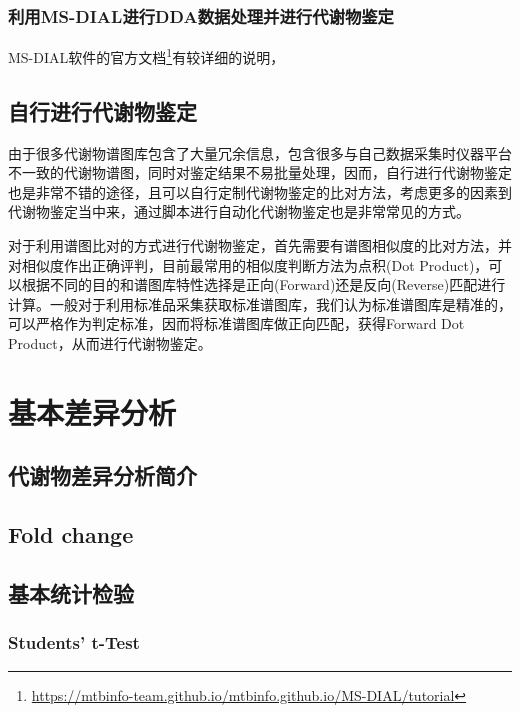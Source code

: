 \documentclass[]{ctexbook}
\renewcommand{\href}[2]{#2\footnote{\url{#1}}}
\begin{document}
\hypertarget{ms-dialdda}{%
\subsection{利用MS-DIAL进行DDA数据处理并进行代谢物鉴定}\label{ms-dialdda}}

MS-DIAL软件的\href{https://mtbinfo-team.github.io/mtbinfo.github.io/MS-DIAL/tutorial}{官方文档}有较详细的说明，

\section{自行进行代谢物鉴定}

由于很多代谢物谱图库包含了大量冗余信息，包含很多与自己数据采集时仪器平台不一致的代谢物谱图，同时对鉴定结果不易批量处理，因而，自行进行代谢物鉴定也是非常不错的途径，且可以自行定制代谢物鉴定的比对方法，考虑更多的因素到代谢物鉴定当中来，通过脚本进行自动化代谢物鉴定也是非常常见的方式。

对于利用谱图比对的方式进行代谢物鉴定，首先需要有谱图相似度的比对方法，并对相似度作出正确评判，目前最常用的相似度判断方法为点积(Dot Product)，可以根据不同的目的和谱图库特性选择是正向(Forward)还是反向(Reverse)匹配进行计算。一般对于利用标准品采集获取标准谱图库，我们认为标准谱图库是精准的，可以严格作为判定标准，因而将标准谱图库做正向匹配，获得Forward Dot Product，从而进行代谢物鉴定。

\hypertarget{chapSTAT}{%
\chapter{基本差异分析}\label{chapSTAT}}

\section{代谢物差异分析简介}

\hypertarget{fold-change}{%
\section{Fold change}\label{fold-change}}

\section{基本统计检验}

\hypertarget{students-t-test}{%
\subsection{Students' t-Test}\label{students-t-test}}
\end{document}
